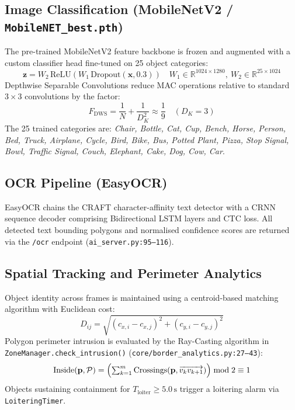 \documentclass[conference]{IEEEtran}
\begin{document}
\subsection{Image Classification (MobileNetV2 / \texttt{MobileNET\_best.pth})}
The pre-trained MobileNetV2 feature backbone is frozen and augmented with a
custom classifier head fine-tuned on 25 object categories:
\begin{equation}
    \mathbf{z} = W_2\,\text{ReLU}\!\left(W_1\,\text{Dropout}(\mathbf{x}, 0.3)\right)
    \quad W_1\!\in\!\mathbb{R}^{1024\times1280},\ W_2\!\in\!\mathbb{R}^{25\times1024}
\end{equation}
Depthwise Separable Convolutions reduce MAC operations relative to standard
$3\!\times\!3$ convolutions by the factor:
\begin{equation}
    F_\text{DWS} = \frac{1}{N} + \frac{1}{D_K^2} \approx \frac{1}{9}
    \quad (D_K=3)
\end{equation}
The 25 trained categories are: \textit{Chair, Bottle, Cat, Cup, Bench,
Horse, Person, Bed, Truck, Airplane, Cycle, Bird, Bike, Bus, Potted Plant,
Pizza, Stop Signal, Bowl, Traffic Signal, Couch, Elephant, Cake, Dog, Cow,
Car}.

\subsection{OCR Pipeline (EasyOCR)}
EasyOCR chains the CRAFT character-affinity text detector with a CRNN
sequence decoder comprising Bidirectional LSTM layers and CTC loss. All
detected text bounding polygons and normalised confidence scores are returned
via the \texttt{/ocr} endpoint (\texttt{ai\_server.py:95--116}).

\subsection{Spatial Tracking and Perimeter Analytics}
Object identity across frames is maintained using a centroid-based matching
algorithm with Euclidean cost:
\begin{equation}
    D_{ij} = \sqrt{(c_{x,i}-c_{x,j})^2 + (c_{y,i}-c_{y,j})^2}
\end{equation}
Polygon perimeter intrusion is evaluated by the Ray-Casting algorithm in
\texttt{ZoneManager.check\_intrusion()} (\texttt{core/border\_analytics.py:27--43}):
\begin{equation}
    \text{Inside}(\mathbf{p},\mathcal{P}) =
    \Bigl(\textstyle\sum_{k=1}^{m}\text{Crossings}(\mathbf{p},
    \overrightarrow{v_k v_{k+1}})\Bigr) \bmod 2 \equiv 1
\end{equation}
Objects sustaining containment for $T_\text{loiter}\!\ge\!5.0\,\text{s}$
trigger a loitering alarm via \texttt{LoiteringTimer}.
\end{document}
